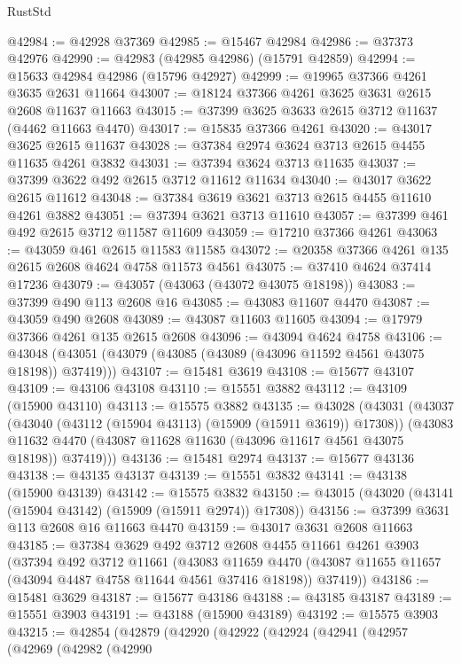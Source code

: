\begin{lexlean}{RustStd}
\begin{coremodule}
@42984 := @42928 @37369
@42985 := @15467 @42984
@42986 := @37373 @42976
@42990 := @42983 (@42985 @42986) (@15791 @42859)
@42994 := @15633 @42984 @42986 (@15796 @42927)
@42999 := @19965 @37366 @4261 @3635 @2631 @11664
@43007 := @18124 @37366 @4261 @3625 @3631 @2615 @2608 @11637 @11663
@43015 := @37399 @3625 @3633 @2615 @3712 @11637 (@4462 @11663 @4470)
@43017 := @15835 @37366 @4261
@43020 := @43017 @3625 @2615 @11637
@43028 := @37384 @2974 @3624 @3713 @2615 @4455 @11635 @4261 @3832
@43031 := @37394 @3624 @3713 @11635
@43037 := @37399 @3622 @492 @2615 @3712 @11612 @11634
@43040 := @43017 @3622 @2615 @11612
@43048 := @37384 @3619 @3621 @3713 @2615 @4455 @11610 @4261 @3882
@43051 := @37394 @3621 @3713 @11610
@43057 := @37399 @461 @492 @2615 @3712 @11587 @11609
@43059 := @17210 @37366 @4261
@43063 := @43059 @461 @2615 @11583 @11585
@43072 := @20358 @37366 @4261 @135 @2615 @2608 @4624 @4758 @11573 @4561
@43075 := @37410 @4624 @37414 @17236
@43079 := @43057 (@43063 (@43072 @43075 @18198))
@43083 := @37399 @490 @113 @2608 @16
@43085 := @43083 @11607 @4470
@43087 := @43059 @490 @2608
@43089 := @43087 @11603 @11605
@43094 := @17979 @37366 @4261 @135 @2615 @2608
@43096 := @43094 @4624 @4758
@43106 := @43048 (@43051 (@43079 (@43085 (@43089 (@43096 @11592 @4561 @43075 @18198)) @37419)))
@43107 := @15481 @3619
@43108 := @15677 @43107
@43109 := @43106 @43108
@43110 := @15551 @3882
@43112 := @43109 (@15900 @43110)
@43113 := @15575 @3882
@43135 := @43028
    (@43031
      (@43037
        (@43040 (@43112 (@15904 @43113) (@15909 (@15911 @3619)) @17308))
        (@43083 @11632 @4470 (@43087 @11628 @11630 (@43096 @11617 @4561 @43075 @18198)) @37419)))
@43136 := @15481 @2974
@43137 := @15677 @43136
@43138 := @43135 @43137
@43139 := @15551 @3832
@43141 := @43138 (@15900 @43139)
@43142 := @15575 @3832
@43150 := @43015 (@43020 (@43141 (@15904 @43142) (@15909 (@15911 @2974)) @17308))
@43156 := @37399 @3631 @113 @2608 @16 @11663 @4470
@43159 := @43017 @3631 @2608 @11663
@43185 := @37384
    @3629
    @492
    @3712
    @2608
    @4455
    @11661
    @4261
    @3903
    (@37394
      @492
      @3712
      @11661
      (@43083
        @11659
        @4470
        (@43087 @11655 @11657 (@43094 @4487 @4758 @11644 @4561 @37416 @18198))
        @37419))
@43186 := @15481 @3629
@43187 := @15677 @43186
@43188 := @43185 @43187
@43189 := @15551 @3903
@43191 := @43188 (@15900 @43189)
@43192 := @15575 @3903
@43215 := @42854
    (@42879
      (@42920
        (@42922
          (@42924
            (@42941
              (@42957
                (@42969
                  (@42982
                    (@42990

\end{coremodule}
\end{lexlean}
